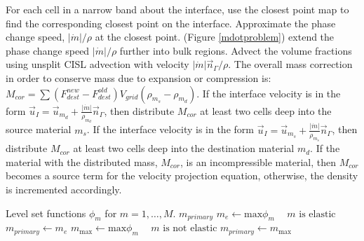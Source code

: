 \documentclass[]{article}
\begin{document}
\begin{algorithm}
\caption{Phase change algorithm\label{phasechange_alg}}
\begin{algorithmic}[1] %
\State For each cell in a narrow band about the interface, use the
  closest point map to find the corresponding closest point on the
  interface.  Approximate the phase change speed, $|\dot{m}|/\rho$ 
  at the closest point. (Figure \ref{mdotproblem})
\State extend the phase change speed $|\dot{m}|/\rho$ 
  further into bulk regions.
\State Advect the volume fractions using unsplit CISL advection
  with velocity $|\dot{m}|\vec{n}_{\Gamma}/\rho$.
\State The overall mass correction in order to conserve mass due to
  expansion or compression is:
  $M_{cor}=\sum (F_{dest}^{new}-F_{dest}^{old})V_{grid}(\rho_{m_{s}}-\rho_{m_{d}})$.
\State If the interface velocity is in the form 
  $\vec{u}_{I}=\vec{u}_{m_{d}}+\frac{|\dot{m}|}{\rho_{m_{d}}}\vec{n}_{\Gamma}$,
  then distribute $M_{cor}$ at least two cells deep into 
  the source material $m_{s}$.
\State If the interface velocity is in the form 
  $\vec{u}_{I}=\vec{u}_{m_{s}}+\frac{|\dot{m}|}{\rho_{m_{s}}}\vec{n}_{\Gamma}$,
  then distribute $M_{cor}$ at least two cells deep into
  the destination material $m_{d}$.
\State If the material with the distributed mass, $M_{cor}$, is an
  incompressible material, then $M_{cor}$ becomes a source term for the
  velocity projection equation, otherwise, the density is incremented 
  accordingly.
\end{algorithmic}
\end{algorithm}

\begin{algorithm}
\caption{Algorithm for determining the unique material number associated
  with a given grid cell \label{im_primary}}
\begin{algorithmic}[1] %
\Require Level set functions $\phi_{m}$ for $m=1,\ldots,M$.
\Ensure $m_{primary}$
\State $m_{e}\gets \mbox{max} \phi_{m} \hspace{15pt} m \mbox{ is elastic}$
 \State $m_{primary}\gets m_{e}$
\Else
 \State $m_{\mbox{max}}\gets \mbox{max} \phi_{m} \hspace{15pt} m \mbox{ is not elastic}$
 \State $m_{primary}\gets m_{\mbox{max}}$
\EndIf
\end{algorithmic}
\end{algorithm}
\end{document}
